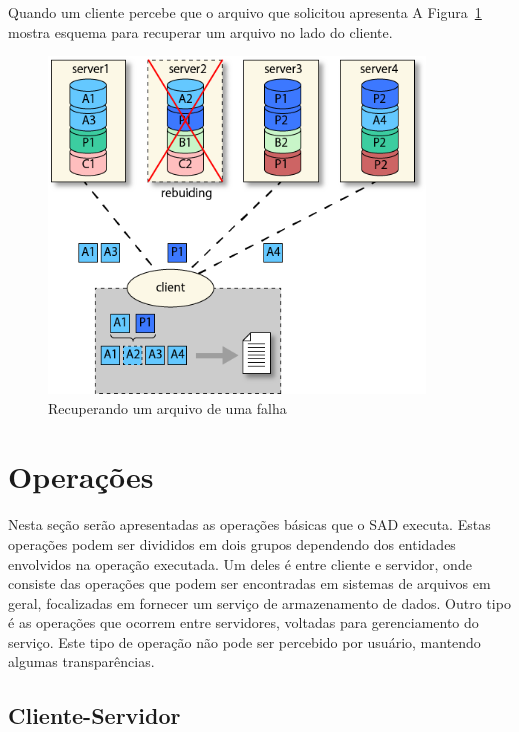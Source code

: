 	Quando um cliente percebe que o arquivo que solicitou apresenta  
	A Figura~\ref{fig:img2} mostra esquema para recuperar um arquivo no lado do cliente.
	
	\begin{figure}[htb]
		\begin{center}
			
			\includegraphics[clip,width=10.0cm]{images/image2.png}
			\caption{Recuperando um arquivo de uma falha}
			\label{fig:img2}
		\end{center}
	\end{figure}
	
	\section{Operações}
	
	Nesta seção serão apresentadas as operações básicas que o SAD executa. Estas operações podem ser divididos em dois grupos dependendo dos entidades envolvidos na operação executada. Um deles é entre cliente e servidor, onde consiste das operações que podem ser encontradas em sistemas de arquivos em geral, focalizadas em fornecer um serviço de armazenamento de dados. Outro tipo é as operações que ocorrem entre servidores, voltadas para gerenciamento do serviço. Este tipo de operação não pode ser percebido por usuário, mantendo algumas transparências.
	
	
	
	\subsection{Cliente-Servidor}
	
